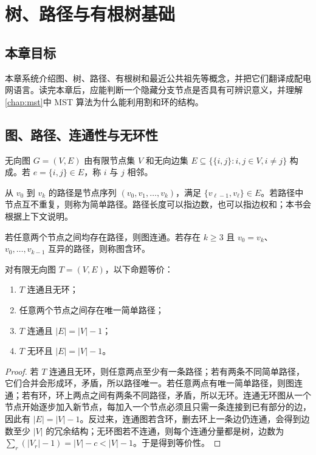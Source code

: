 \chapter{树、路径与有根树基础}
\label{chap:trees}

\section*{本章目标}
本章系统介绍图、树、路径、有根树和最近公共祖先等概念，并把它们翻译成配电网语言。读完本章后，应能判断一个隐藏分支节点是否具有可辨识意义，并理解\cref{chap:mst}中 MST 算法为什么能利用割和环的结构。

\section{图、路径、连通性与无环性}

\begin{definition}[无向图]
无向图 $G=(V,E)$ 由有限节点集 $V$ 和无向边集 $E\subseteq \{\{i,j\}:i,j\in V,i\ne j\}$ 构成。若 $e=\{i,j\}\in E$，称 $i$ 与 $j$ 相邻。
\end{definition}

\begin{definition}[路径和简单路径]
从 $v_0$ 到 $v_k$ 的路径是节点序列 $(v_0,v_1,\ldots,v_k)$，满足 $\{v_{\ell-1},v_\ell\}\in E$。若路径中节点互不重复，则称为简单路径。路径长度可以指边数，也可以指边权和；本书会根据上下文说明。
\end{definition}

\begin{definition}[连通与环]
若任意两个节点之间均存在路径，则图连通。若存在 $k\ge 3$ 且 $v_0=v_k$、$v_0,\ldots,v_{k-1}$ 互异的路径，则称图含环。
\end{definition}

\begin{theorem}[树的等价刻画]
\label{thm:tree_equiv}
对有限无向图 $T=(V,E)$，以下命题等价：
\begin{enumerate}[label=(\roman*)]
  \item $T$ 连通且无环；
  \item 任意两个节点之间存在唯一简单路径；
  \item $T$ 连通且 $|E|=|V|-1$；
  \item $T$ 无环且 $|E|=|V|-1$。
\end{enumerate}
\end{theorem}

\begin{proof}
若 $T$ 连通且无环，则任意两点至少有一条路径；若有两条不同简单路径，它们合并会形成环，矛盾，所以路径唯一。若任意两点有唯一简单路径，则图连通；若有环，环上两点之间有两条不同路径，矛盾，所以无环。连通无环图从一个节点开始逐步加入新节点，每加入一个节点必须且只需一条连接到已有部分的边，因此有 $|E|=|V|-1$。反过来，连通图若含环，删去环上一条边仍连通，会得到边数至少 $|V|$ 的冗余结构；无环图若不连通，则每个连通分量都是树，边数为 $\sum_r(|V_r|-1)=|V|-c<|V|-1$。于是得到等价性。
\end{proof}

